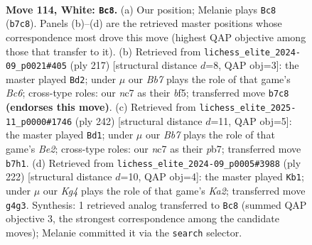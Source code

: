 \documentclass[11pt]{article}
\begin{document}
\clearpage

\begin{figure}[p]\centering
\begin{subfigure}{0.46\textwidth}\centering
\resizebox{\linewidth}{!}{%
\newchessgame
\chessboard[
  setfen={8/1Bn3k1/8/6P1/6KP/8/8/8 w - - 0 114},
  showmover=false,
  pgfstyle=straightmove, color=movearrow, markmove={b7-c8}
]}
\caption{}
\end{subfigure}\hfill
\begin{subfigure}{0.46\textwidth}\centering
\resizebox{\linewidth}{!}{%
\newchessgame
\chessboard[
  setfen={8/4k3/5p2/3K1Bp1/8/2b5/8/8 b - - 25 109},
  showmover=false,
  pgfstyle=straightmove, color=movearrow, markmove={c3-d2}
]}
\caption{}
\end{subfigure}
\\[4pt]
\begin{subfigure}{0.46\textwidth}\centering
\resizebox{\linewidth}{!}{%
\newchessgame
\chessboard[
  setfen={1k6/1p6/3P4/2PK4/7b/8/4B3/8 w - - 43 122},
  showmover=false,
  pgfstyle=straightmove, color=movearrow, markmove={e2-d1}
]}
\caption{}
\end{subfigure}\hfill
\begin{subfigure}{0.46\textwidth}\centering
\resizebox{\linewidth}{!}{%
\newchessgame
\chessboard[
  setfen={8/8/8/2k2N2/P4b2/1P6/K7/8 w - - 53 112},
  showmover=false,
  pgfstyle=straightmove, color=movearrow, markmove={a2-b1}
]}
\caption{}
\end{subfigure}
\caption{\textbf{Move 114, White: \texttt{Bc8}.} (a) Our position; Melanie plays \texttt{Bc8} (\texttt{b7c8}). Panels (b)--(d) are the retrieved master positions whose correspondence most drove this move (highest QAP objective among those that transfer to it). (b) Retrieved from \texttt{lichess\_elite\_2024-09\_p0021\#405} (ply 217) [structural distance $d$=8, QAP obj=3]: the master played \texttt{Bd2}; under $\mu$ our \emph{Bb7} plays the role of that game's \emph{Bc6}; cross-type roles: our \emph{n}c7 as their \emph{b}f5; transferred move \texttt{b7c8} \textbf{(endorses this move)}. (c) Retrieved from \texttt{lichess\_elite\_2025-11\_p0000\#1746} (ply 242) [structural distance $d$=11, QAP obj=5]: the master played \texttt{Bd1}; under $\mu$ our \emph{Bb7} plays the role of that game's \emph{Be2}; cross-type roles: our \emph{n}c7 as their \emph{p}b7; transferred move \texttt{b7h1}. (d) Retrieved from \texttt{lichess\_elite\_2024-09\_p0005\#3988} (ply 222) [structural distance $d$=10, QAP obj=4]: the master played \texttt{Kb1}; under $\mu$ our \emph{Kg4} plays the role of that game's \emph{Ka2}; transferred move \texttt{g4g3}. Synthesis: 1 retrieved analog transferred to \texttt{Bc8} (summed QAP objective 3, the strongest correspondence among the candidate moves); Melanie committed it via the \texttt{search} selector.}
\label{fig:thought-m226}
\end{figure}
\end{document}
